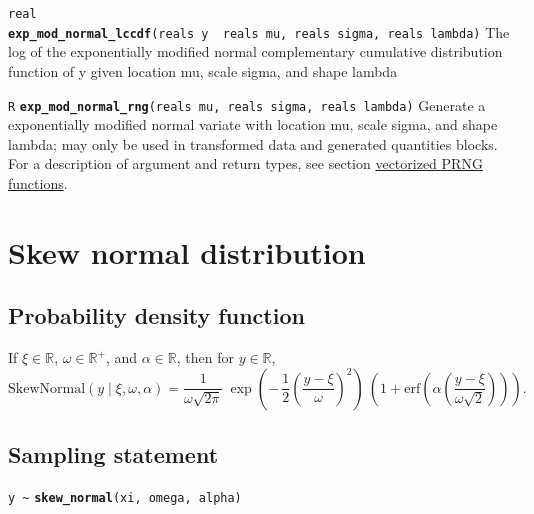 \documentclass[
  10pt,
]{book}
\begin{document}

\texttt{real} \textbf{\texttt{exp\_mod\_normal\_lccdf}}\texttt{(reals\ y\ \textbar{}\ reals\ mu,\ reals\ sigma,\ reals\ lambda)}\newline
The log of the exponentially modified normal complementary cumulative
distribution function of y given location mu, scale sigma, and shape
lambda


\texttt{R} \textbf{\texttt{exp\_mod\_normal\_rng}}\texttt{(reals\ mu,\ reals\ sigma,\ reals\ lambda)}\newline
Generate a exponentially modified normal variate with location mu,
scale sigma, and shape lambda; may only be used in transformed data and generated
quantities blocks. For a description of argument and return types, see
section \protect\hyperlink{prng-vectorization}{vectorized PRNG functions}.

\hypertarget{skew-normal-distribution}{%
\section{Skew normal distribution}\label{skew-normal-distribution}}

\hypertarget{probability-density-function-2}{%
\subsection{Probability density function}\label{probability-density-function-2}}

If \(\xi \in \mathbb{R}\), \(\omega \in \mathbb{R}^+\), and \(\alpha \in \mathbb{R}\), then for \(y \in \mathbb{R}\), \[ \text{SkewNormal}(y \mid
\xi, \omega, \alpha) = \frac{1}{\omega\sqrt{2\pi}} \ \exp\left( - \,
\frac{1}{2}            \left(  \frac{y - \xi}{\omega} \right)^2
\right) \ \left(1 + \text{erf}\left( \alpha\left(\frac{y -
\xi}{\omega\sqrt{2}}\right)\right)\right) . \]

\hypertarget{sampling-statement-26}{%
\subsection{Sampling statement}\label{sampling-statement-26}}

\texttt{y\ \textasciitilde{}} \textbf{\texttt{skew\_normal}}\texttt{(xi,\ omega,\ alpha)}
\end{document}
